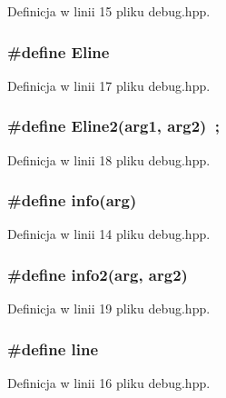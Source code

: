 Definicja w linii 15 pliku debug.hpp.\hypertarget{a00008_9944134306515208e366f3f347ef3653}{
\subsubsection[{Eline}]{\setlength{\rightskip}{0pt plus 5cm}\#define Eline}}
\label{a00008_9944134306515208e366f3f347ef3653}




Definicja w linii 17 pliku debug.hpp.\hypertarget{a00008_68b6fd999967bd748d50fc2014bc5903}{
\subsubsection[{Eline2}]{\setlength{\rightskip}{0pt plus 5cm}\#define Eline2(arg1, \/  arg2)~;}}
\label{a00008_68b6fd999967bd748d50fc2014bc5903}




Definicja w linii 18 pliku debug.hpp.\hypertarget{a00008_590af51ecfed28223c4e6ce02994241a}{
\subsubsection[{info}]{\setlength{\rightskip}{0pt plus 5cm}\#define info(arg)}}
\label{a00008_590af51ecfed28223c4e6ce02994241a}




Definicja w linii 14 pliku debug.hpp.\hypertarget{a00008_51633d6d15647d74f756bcf969fc70ae}{
\subsubsection[{info2}]{\setlength{\rightskip}{0pt plus 5cm}\#define info2(arg, \/  arg2)}}
\label{a00008_51633d6d15647d74f756bcf969fc70ae}




Definicja w linii 19 pliku debug.hpp.\hypertarget{a00008_5bdec07ba0f5f220bcb40d5258725d95}{
\subsubsection[{line}]{\setlength{\rightskip}{0pt plus 5cm}\#define line}}
\label{a00008_5bdec07ba0f5f220bcb40d5258725d95}




Definicja w linii 16 pliku debug.hpp.
